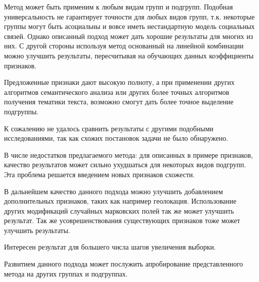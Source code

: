 \documentclass[annotation,times,page4]{itmo-student-thesis}
\begin{document}
Метод может быть применим к любым видам групп и подгрупп. Подобная универсальность не гарантирует точности для любых видов групп, т.к. некоторые группы могут быть асоциальны и вовсе иметь нестандартную модель социальных связей. Однако описанный подход может дать хорошие результаты для многих из них. С другой стороны используя метод основанный на линейной комбинации можно улучшить результаты, пересчитывая на обучающих данных коэффициенты признаков. 

Предложенные признаки дают высокую полноту, а при применении других алгоритмов семантического анализа или других более точных алгоритмов получения тематики текста, возможно смогут дать более точное выделение подгруппы.

К сожалению не удалось сравнить результаты с другими подобными исследованиями, так как схожих постановок задачи не было обнаружено.

В числе недостатков предлагаемого метода: для описанных в примере признаков, качество результатов может сильно ухудшаться для некоторых видов подгрупп. Эта проблема решается введением новых признаков схожести.

В дальнейшем качество данного подхода можно улучшить добавлением дополнительных признаков, таких как например геолокация. Использование других модификаций случайных марковских полей так же может улучшить результат. Так же усоврешенствования существующих признаков тоже может улучшить результаты.

Интересен результат для большего числа шагов увеличения выборки.

Развитием данного подхода может послужить апробирование представленного метода на других группах и подгруппах.

\printbibliography[heading=trueHeading]

\appendix
\end{document}
